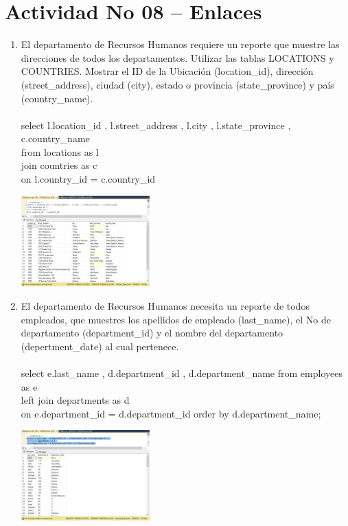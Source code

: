 \section{Actividad No 08 – Enlaces} 
		
\begin{enumerate}[1.]
	\item El departamento de Recursos Humanos requiere un reporte que muestre las direcciones de todos los departamentos. Utilizar las tablas LOCATIONS y COUNTRIES. Mostrar el ID de la Ubicación (location\_id), dirección (street\_address), ciudad (city), estado o provincia (state\_province) y país (country\_name). %
	\\
	\\select l.location\_id , l.street\_address , l.city , l.state\_province , c.country\_name 
	\\from locations as l 
	\\join countries as c 
	\\on l.country\_id = c.country\_id

	\begin{center}
	\includegraphics[width=5cm]{./Imagenes/8ejer1} 
	\end{center}


	\item El departamento de Recursos Humanos necesita un reporte de todos empleados, que muestres los apellidos de empleado (last\_name), el No de departamento (department\_id) y el nombre del departamento (depertment\_date) al cual pertenece. 
	\\
	\\select e.last\_name , d.department\_id , d.department\_name from employees as e
	\\left join departments as d 
	\\on e.department\_id = d.department\_id order by d.department\_name;

	\begin{center}
	\includegraphics[width=5cm]{./Imagenes/8ejer2} 
	\end{center}


\end{enumerate}
